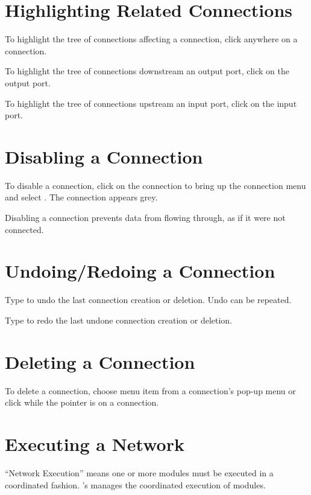 \section{Highlighting Related Connections}
\label{sec:highlightconnect}

To highlight the tree of connections affecting a connection, click
 anywhere on a connection.

To highlight the tree of connections downstream an output port,
click  on the output port.

To highlight the tree of connections upstream an input port,
click  on the input port.

\section{Disabling a Connection}
\label{sec:disableconnect}

To disable a connection, click  on the connection to
bring up the connection menu and select . The
connection appears grey.

Disabling a connection prevents data from flowing through, as if it were
not connected.

\section{Undoing/Redoing a Connection}
\label{sec:undomod}

Type  to undo the last connection creation or deletion.
Undo can be repeated.

Type  to redo the last undone connection creation or
deletion.
 
\section{Deleting a Connection}
\label{sec:deleteconnections}

To delete a connection, choose menu item  from a
connection's pop-up menu or click  while the
pointer is on a connection.

\section{Executing a Network}
\label{sec:executenet}

``Network Execution'' means one or more modules must be executed in a
coordinated fashion. 
\sr{}'s  manages the coordinated execution of modules.

